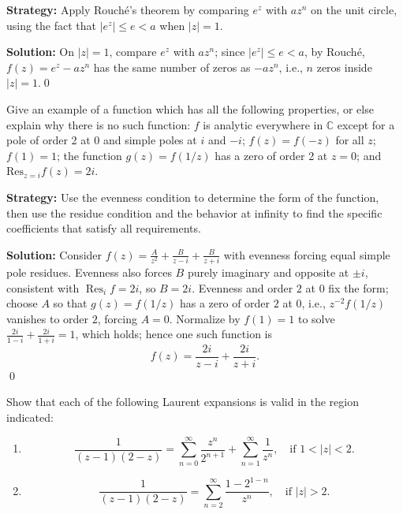 \noindent\textbf{Strategy:} Apply Rouché's theorem by comparing \( e^z \) with \( a z^n \) on the unit circle, using the fact that \( |e^z| \leq e < a \) when \( |z| = 1 \).

\bigskip\noindent\textbf{Solution:}
On $|z|=1$, compare $e^z$ with $a z^n$; since $|e^z|\le e< a$, by Rouché, $f(z)=e^z-az^n$ has the same number of zeros as $-az^n$, i.e., $n$ zeros inside $|z|=1$.\qed


\begin{problembox}
Give an example of a function which has all the following properties, or else explain why there is no such function: \( f \) is analytic everywhere in \( \mathbb{C} \) except for a pole of order 2 at 0 and simple poles at \( i \) and \( -i \); \( f(z) = f(-z) \) for all \( z \); \( f(1) = 1 \); the function \( g(z) = f(1/z) \) has a zero of order 2 at \( z = 0 \); and \( \text{Res}_{z=i} f(z) = 2i \).
\end{problembox}

\noindent\textbf{Strategy:} Use the evenness condition to determine the form of the function, then use the residue condition and the behavior at infinity to find the specific coefficients that satisfy all requirements.

\bigskip\noindent\textbf{Solution:}
Consider $f(z)=\frac{A}{z^2}+\frac{B}{z-i}+\frac{B}{z+i}$ with evenness forcing equal simple pole residues. Evenness also forces $B$ purely imaginary and opposite at $\pm i$, consistent with $\operatorname{Res}_{i}f=2i$, so $B=2i$. Evenness and order $2$ at $0$ fix the form; choose $A$ so that $g(z)=f(1/z)$ has a zero of order $2$ at $0$, i.e., $z^{-2}f(1/z)$ vanishes to order $2$, forcing $A=0$. Normalize by $f(1)=1$ to solve $\frac{2i}{1-i}+\frac{2i}{1+i}=1$, which holds; hence one such function is
\[f(z)=\frac{2i}{z-i}+\frac{2i}{z+i}.
\]\qed


\begin{problembox}
Show that each of the following Laurent expansions is valid in the region indicated:
\begin{enumerate}[label=(\alph*)]
\item \[ \frac{1}{(z - 1)(2 - z)} = \sum_{n=0}^{\infty} \frac{z^n}{2^{n+1}} + \sum_{n=1}^{\infty} \frac{1}{z^n}, \quad \text{if } 1 < |z| < 2. \]
\item \[ \frac{1}{(z - 1)(2 - z)} = \sum_{n=2}^{\infty} \frac{1 - 2^{1-n}}{z^n}, \quad \text{if } |z| > 2. \]
\end{enumerate}
\end{problembox}

